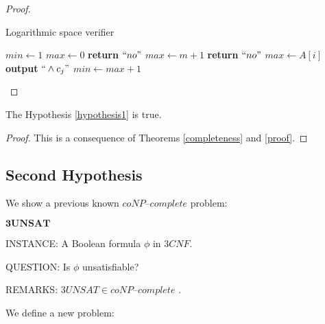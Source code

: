 \documentclass[a4paper,UKenglish,cleveref, autoref]{lipics-v2019}
\begin{document}
\begin{proof}
\begin{algorithm}
\caption{Logarithmic space verifier}\label{algorithm1}
\begin{algorithmic}[1]
\State $min \gets 1$
\State $max \gets 0$
\State \textbf{return} $``no"$
\EndIf
{}
\State $max \gets m + 1$
\State \textbf{return} $``no"$
\Else
\State $max \gets A[i]$
\EndIf
{}
\State \textbf{output} $``\wedge c_{j}"$
\EndFor
\State $min \gets max + 1$
\EndFor
\EndProcedure
\end{algorithmic}
\end{algorithm}
\end{proof}

\begin{theorem}
\label{result1}
The Hypothesis \ref{hypothesis1} is true.
\end{theorem}

\begin{proof}
This is a consequence of Theorems \ref{completeness} and \ref{proof}.
\end{proof}

\subsection{Second Hypothesis}

We show a previous known $\textit{coNP--complete}$ problem:

\begin{definition}
$\textbf{3UNSAT}$

INSTANCE: A Boolean formula $\phi$ in $3CNF$.

QUESTION: Is $\phi$ unsatisfiable?

REMARKS: $3UNSAT \in \textit{coNP--complete}$ \cite{GJ79}.
\end{definition}

We define a new problem:
\end{document}
